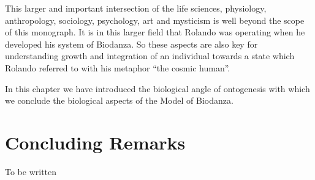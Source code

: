 \documentclass[
  11pt,
]{book}
\begin{document}
This larger and important intersection of the life sciences, physiology, anthropology, sociology, psychology, art and mysticism is well beyond the scope of this monograph. It is in this larger field that Rolando was operating when he developed his system of Biodanza. So these aspects are also key for understanding growth and integration of an individual towards a state which Rolando referred to with his metaphor ``the cosmic human''.

In this chapter we have introduced the biological angle of ontogenesis with which we conclude the biological aspects of the Model of Biodanza.

\hypertarget{concluding-remarks}{%
\chapter{Concluding Remarks}\label{concluding-remarks}}

To be written

  
\end{document}
